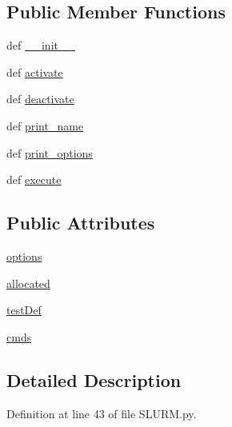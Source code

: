 \subsection*{Public Member Functions}
\begin{DoxyCompactItemize}
\item 
def \hyperlink{classSLURM_1_1SLURM_aa985bacce290322ef03060d671e705a1}{\-\_\-\-\_\-init\-\_\-\-\_\-}
\item 
def \hyperlink{classSLURM_1_1SLURM_a7b3b5d04275a853d623f6fff36b76e7e}{activate}
\item 
def \hyperlink{classSLURM_1_1SLURM_a4622d35bba26ef97a305e9d057e5db6c}{deactivate}
\item 
def \hyperlink{classSLURM_1_1SLURM_a79a9d29418a1a20a9d502c0723c3e8e7}{print\-\_\-name}
\item 
def \hyperlink{classSLURM_1_1SLURM_ad735f2669f29aca338d4dc61b6423284}{print\-\_\-options}
\item 
def \hyperlink{classSLURM_1_1SLURM_ab53b5b6093e23284f0f8494fc2be2263}{execute}
\end{DoxyCompactItemize}
\subsection*{Public Attributes}
\begin{DoxyCompactItemize}
\item 
\hyperlink{classSLURM_1_1SLURM_a652a43986b8bda5c6ddb866ab0513ac8}{options}
\item 
\hyperlink{classSLURM_1_1SLURM_aee4130d6ff2007d08fad045aedd69781}{allocated}
\item 
\hyperlink{classSLURM_1_1SLURM_a9b08ef79e039a8524f1fa6712b45182b}{test\-Def}
\item 
\hyperlink{classSLURM_1_1SLURM_ab755a940fd09c8fa416c177f692d31d6}{cmds}
\end{DoxyCompactItemize}


\subsection{Detailed Description}


Definition at line 43 of file S\-L\-U\-R\-M.\-py.



